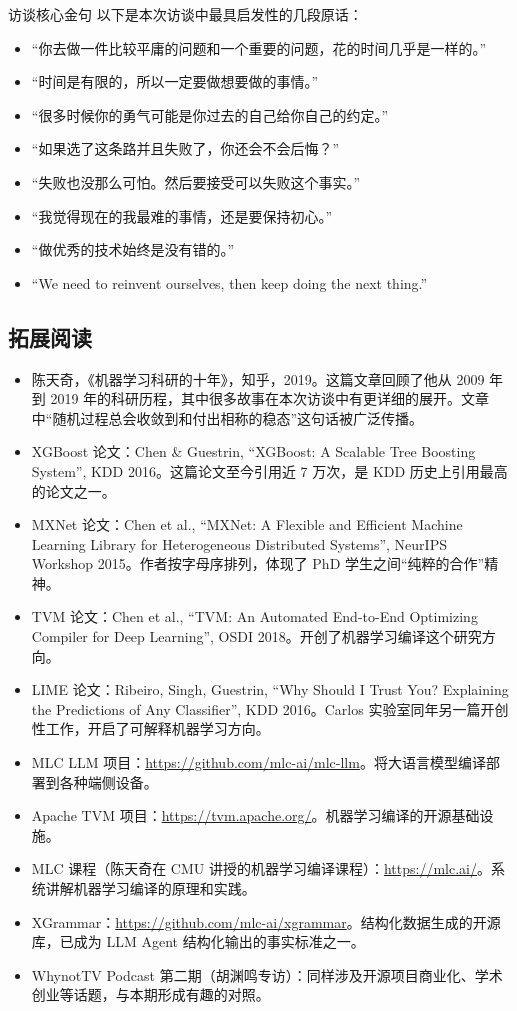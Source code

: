 \begin{importantbox}{访谈核心金句}
以下是本次访谈中最具启发性的几段原话：
\begin{itemize}
    \item ``你去做一件比较平庸的问题和一个重要的问题，花的时间几乎是一样的。''
    \item ``时间是有限的，所以一定要做想要做的事情。''
    \item ``很多时候你的勇气可能是你过去的自己给你自己的约定。''
    \item ``如果选了这条路并且失败了，你还会不会后悔？''
    \item ``失败也没那么可怕。然后要接受可以失败这个事实。''
    \item ``我觉得现在的我最难的事情，还是要保持初心。''
    \item ``做优秀的技术始终是没有错的。''
    \item ``We need to reinvent ourselves, then keep doing the next thing.''
\end{itemize}
\end{importantbox}

\subsection{拓展阅读}

\begin{itemize}
    \item 陈天奇，《机器学习科研的十年》，知乎，2019。这篇文章回顾了他从 2009 年到 2019 年的科研历程，其中很多故事在本次访谈中有更详细的展开。文章中``随机过程总会收敛到和付出相称的稳态''这句话被广泛传播。
    \item XGBoost 论文：Chen \& Guestrin, ``XGBoost: A Scalable Tree Boosting System'', KDD 2016。这篇论文至今引用近 7 万次，是 KDD 历史上引用最高的论文之一。
    \item MXNet 论文：Chen et al., ``MXNet: A Flexible and Efficient Machine Learning Library for Heterogeneous Distributed Systems'', NeurIPS Workshop 2015。作者按字母序排列，体现了 PhD 学生之间``纯粹的合作''精神。
    \item TVM 论文：Chen et al., ``TVM: An Automated End-to-End Optimizing Compiler for Deep Learning'', OSDI 2018。开创了机器学习编译这个研究方向。
    \item LIME 论文：Ribeiro, Singh, Guestrin, ``Why Should I Trust You? Explaining the Predictions of Any Classifier'', KDD 2016。Carlos 实验室同年另一篇开创性工作，开启了可解释机器学习方向。
    \item MLC LLM 项目：\url{https://github.com/mlc-ai/mlc-llm}。将大语言模型编译部署到各种端侧设备。
    \item Apache TVM 项目：\url{https://tvm.apache.org/}。机器学习编译的开源基础设施。
    \item MLC 课程（陈天奇在 CMU 讲授的机器学习编译课程）：\url{https://mlc.ai/}。系统讲解机器学习编译的原理和实践。
    \item XGrammar：\url{https://github.com/mlc-ai/xgrammar}。结构化数据生成的开源库，已成为 LLM Agent 结构化输出的事实标准之一。
    \item WhynotTV Podcast 第二期（胡渊鸣专访）：同样涉及开源项目商业化、学术创业等话题，与本期形成有趣的对照。
\end{itemize}


